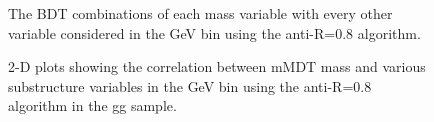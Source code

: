 \begin{figure}
\begin{center}
\caption{The BDT combinations of each mass variable with every other
variable considered in the  GeV bin using the anti-\kT R=0.8 algorithm.}
\label{fig:pt500_masscomb_AKt_R08}
\end{center}
\end{figure}


\begin{figure}
\begin{center}
\caption{2-D plots showing the correlation between mMDT mass and
  various substructure variables in the  GeV bin using the
  anti-\kT R=0.8 algorithm in the gg sample.}
\label{fig:pt500_2d_mmdt_AKt_R08}
\end{center}
\end{figure}

